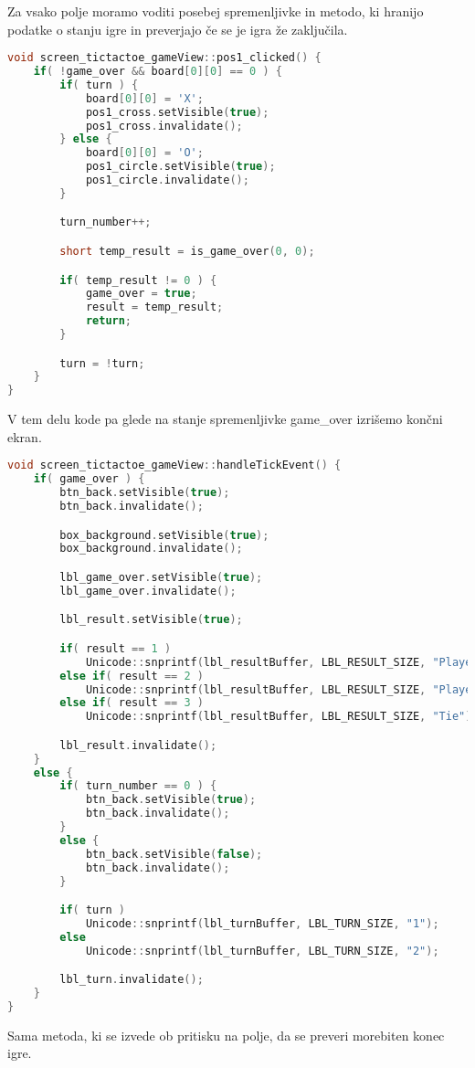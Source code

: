 \documentclass{article}
\begin{document}
\noindent
Za vsako polje moramo voditi posebej spremenljivke in metodo, ki
hranijo podatke o stanju igre in preverjajo \v{c}e se je igra \v{z}e
zaklju\v{c}ila.

\begin{lstlisting}[language=c++]
void screen_tictactoe_gameView::pos1_clicked() {
	if( !game_over && board[0][0] == 0 ) {
		if( turn ) {
			board[0][0] = 'X';
			pos1_cross.setVisible(true);
			pos1_cross.invalidate();
		} else {
			board[0][0] = 'O';
			pos1_circle.setVisible(true);
			pos1_circle.invalidate();
		}

		turn_number++;

		short temp_result = is_game_over(0, 0);

		if( temp_result != 0 ) {
			game_over = true;
			result = temp_result;
			return;
		}

		turn = !turn;
	}
}
\end{lstlisting}

\noindent
V tem delu kode pa glede na stanje spremenljivke game\_over izri\v{s}emo
kon\v{c}ni ekran.
\begin{lstlisting}[language=c++]
void screen_tictactoe_gameView::handleTickEvent() {
	if( game_over ) {
		btn_back.setVisible(true);
		btn_back.invalidate();

		box_background.setVisible(true);
		box_background.invalidate();

		lbl_game_over.setVisible(true);
		lbl_game_over.invalidate();

		lbl_result.setVisible(true);

		if( result == 1 )
			Unicode::snprintf(lbl_resultBuffer, LBL_RESULT_SIZE, "Player 1 wins");
		else if( result == 2 )
			Unicode::snprintf(lbl_resultBuffer, LBL_RESULT_SIZE, "Player 2 wins");
		else if( result == 3 )
			Unicode::snprintf(lbl_resultBuffer, LBL_RESULT_SIZE, "Tie");

		lbl_result.invalidate();
	}
	else {
		if( turn_number == 0 ) {
			btn_back.setVisible(true);
			btn_back.invalidate();
		}
		else {
			btn_back.setVisible(false);
			btn_back.invalidate();
		}

		if( turn )
			Unicode::snprintf(lbl_turnBuffer, LBL_TURN_SIZE, "1");
		else
			Unicode::snprintf(lbl_turnBuffer, LBL_TURN_SIZE, "2");

		lbl_turn.invalidate();
	}
}
\end{lstlisting}

\noindent
Sama metoda, ki se izvede ob pritisku na polje, da se preveri morebiten
konec igre.
\end{document}
